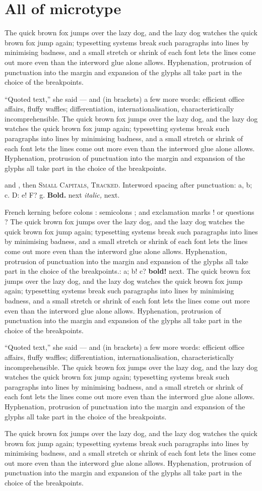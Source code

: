 \documentclass[twocolumn]{article}
\def\fewwords{The quick brown fox jumps over the lazy dog, and the lazy dog watches the quick
brown fox jump again; typesetting systems break such paragraphs into lines by minimising
badness, and a small stretch or shrink of each font lets the lines come out more even than
the interword glue alone allows. Hyphenation, protrusion of punctuation into the margin and
expansion of the glyphs all take part in the choice of the breakpoints.}
\def\somewords{\fewwords\par ``Quoted text,'' she said --- and (in brackets) a few more words:
efficient office affairs, fluffy waffles; differentiation, internationalisation,
characteristically incomprehensible. \fewwords\par}
\begin{document}
\section{All of microtype}
\somewords {} and , then
\textsc{Small Capitals, Tracked}. Interword spacing after punctuation: a, b; c. D: e! F? g.
\textbf{Bold.} next {\itshape italic,} next.

French kerning before colons : semicolons ; and exclamation marks ! or questions ?
\fewwords: a; b! c? \textbf{bold!} next.
\somewords
\begin{minipage}{0.8\columnwidth}\fewwords\end{minipage}
\end{document}
